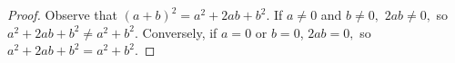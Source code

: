 \begin{proof}
    Observe that $(a+b)^2=a^2+2ab+b^2.$ If $a\neq 0$ and $b\neq0,$ $2ab\neq 0,$ so $a^2+2ab+b^2\neq a^2+b^2.$ Conversely, if $a=0$ or $b=0$, $2ab=0,$ so $a^2+2ab+b^2=a^2+b^2.$
  \end{proof}